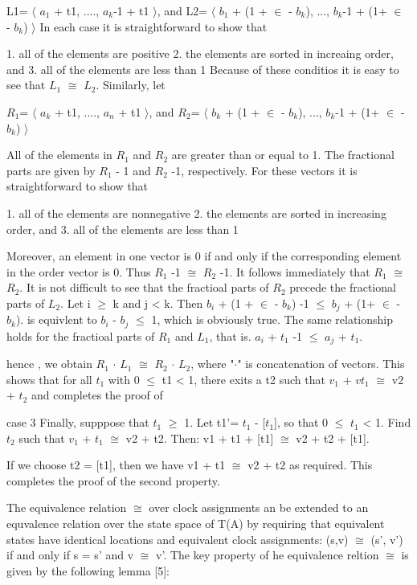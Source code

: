 L1= $\langle$ $a_1$ + t1, ...., $a_k$-1 + t1    $\rangle$, and
L2= $\langle$  $b_1$ + (1 + $\in$ - $b_k$), ..., $b_k$-1 + (1+ $\in$ - $b_k$)  $\rangle$
In each case it is straightforward to show that

1. all of the elements are positive
2. the elements are sorted in increaing order, and
3. all of the elements are less than 1
Because of these conditios it is easy to see that $L_1$ $\cong$ $L_2$. Similarly, let 

$R_1$= $\langle$ $a_k$ + t1, ...., $a_n$ + t1    $\rangle$, and
$R_2$= $\langle$  $b_k$ + (1 + $\in$ - $b_k$), ..., $b_k$-1 + (1+ $\in$ - $b_k$)  $\rangle$

All of the elements in $R_1$ and $R_2$ are greater than or equal to 1. The fractional parts are given by $R_1$ - 1 and $R_2$ -1, respectively. For these vectors it is straightforward to show that

1. all of the elements are nonnegative
2. the elements are sorted in increasing order, and
3. all of the elements are less than 1

Moreover, an element in one vector is 0 if and only if the corresponding element in the order vector is 0. Thus $R_1$ -1 $\cong$ $R_2$ -1. It follows immediately that $R_1$ $\cong$ $R_2$.
It is not difficult to see that the fractioal parts of $R_2$ precede the fractional parts of $L_2$.
Let i  $\geq$ k and j < k. Then
$b_i$ +  (1 + $\in$ - $b_k$) -1 $\leq$ $b_j$ + (1+ $\in$ - $b_k$).
is equivlent to $b_i$ - $b_j$ $\leq$ 1, which is obviously true. The same relationship holds for the fractioal parts of $R_1$ and $L_1$, that is.
$a_i$ + $t_1$ -1 $\leq$ $a_j$ + $t_1$.

hence , we obtain $R_1$ $\cdot$ $L_1$ $\cong$ $R_2$ $\cdot$ $L_2$, where "$\cdot$" is concatenation of vectors. This shows that for all $t_1$ with 0 $\leq$ t1 < 1, there exits a t2 such that $v_1$ + $vt_1$ $\cong$ v2 + $t_2$ and completes the proof of 



case 3
Finally, supppose that $t_1$ $\geq$ 1. Let t1'= $t_1$ - [$t_1$], so that 0 $\leq$ $t_1$ < 1. Find $t_2$ such that $v_1$ + $t_1$ $\cong$ v2 + t2. Then:
v1 + t1 + [t1]  $\cong$ v2 + t2 + [t1].

If we choose t2 = [t1], then we have v1 + t1 $\cong$ v2 + t2 as required. This completes the proof of the second property.

The equivalence relation $\cong$ over clock assignments an be extended to an equvalence relation over the state space of T(A) by requiring that equivalent states have identical locations and equivalent clock assignments: (s,v) $\cong$ (s', v') if and only if s = s' and v $\cong$ v'. The key property of he equivalence reltion $\cong$ is given by the following lemma [5]:


